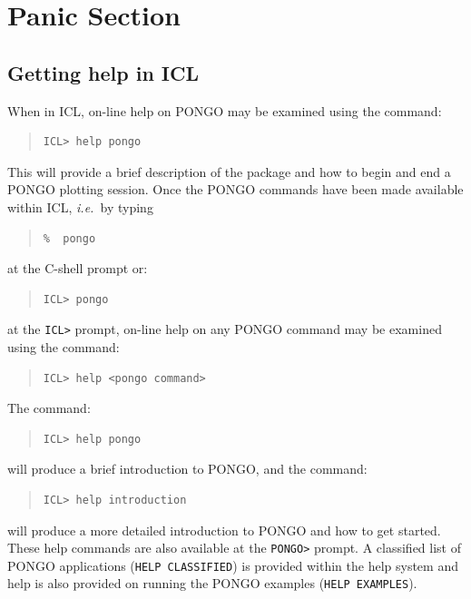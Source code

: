 \documentclass[twoside,11pt]{article}
\renewcommand{\_}{\texttt{\symbol{95}}}
\newcommand{\ie}{{\em i.e.\ }}
\newcommand{\cnam}[1]{{\tt #1}}
\begin{document}
\section{Panic Section}

\subsection{Getting help in ICL}

When in ICL, on-line help on PONGO may be examined using the command:
\begin{quote}
\begin{verbatim}
ICL> help pongo
\end{verbatim}
\end{quote}
This will provide a brief description of the package and how to begin and end a
PONGO plotting session.
Once the PONGO commands have been made available within ICL, \ie by typing
\begin{quote}
\begin{verbatim}
%  pongo
\end{verbatim}
\end{quote}
at the C-shell prompt or:
\begin{quote}
\begin{verbatim}
ICL> pongo
\end{verbatim}
\end{quote}
at the \verb+ICL>+ prompt, on-line help on any PONGO command may be examined
using the command:
\begin{quote}
\begin{verbatim}
ICL> help <pongo command>
\end{verbatim}
\end{quote}
The command:
\begin{quote}
\begin{verbatim}
ICL> help pongo
\end{verbatim}
\end{quote}
will produce a brief introduction to PONGO, and the command:
\begin{quote}
\begin{verbatim}
ICL> help introduction
\end{verbatim}
\end{quote}
will produce a more detailed introduction to PONGO and how to get
started.  These help commands are also available at the \verb+PONGO>+
prompt.  A classified list of PONGO applications (\cnam{HELP
CLASSIFIED}) is provided within the help system and help is also
provided on running the PONGO examples (\cnam{HELP EXAMPLES}).
\end{document}
